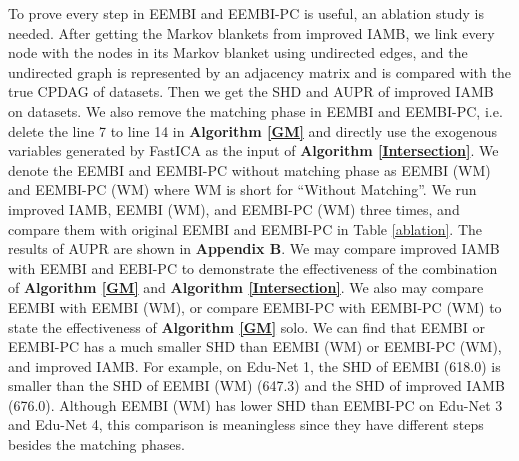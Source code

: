 \documentclass[twoside,11pt]{article}
\begin{document}
To prove every step in EEMBI and EEMBI-PC is useful, an ablation study is needed. After getting the Markov blankets from improved IAMB, we link every node with the nodes in its Markov blanket using undirected edges, and the undirected graph is represented by an adjacency matrix and is compared with the true CPDAG of datasets. Then we get the SHD and AUPR of improved IAMB on datasets. We also remove the matching phase in EEMBI and EEMBI-PC, i.e. delete the line 7 to line 14 in \textbf{Algorithm \ref{GM}} and directly use the exogenous variables generated by FastICA as the input of \textbf{Algorithm \ref{Intersection}}. We denote the EEMBI and EEMBI-PC without matching phase as EEMBI (WM) and EEMBI-PC (WM) where WM is short for ``Without Matching''. We run improved IAMB, EEMBI (WM), and EEMBI-PC (WM) three times, and compare them with original EEMBI and EEMBI-PC in Table \ref{ablation}. The results of AUPR are shown in \textbf{Appendix B}. We may compare improved IAMB with EEMBI and EEBI-PC to demonstrate the effectiveness of the combination of \textbf{Algorithm \ref{GM}} and \textbf{Algorithm \ref{Intersection}}. We also may compare EEMBI with EEMBI (WM), or compare EEMBI-PC with EEMBI-PC (WM) to state the effectiveness of \textbf{Algorithm \ref{GM}} solo. We can find that EEMBI or EEMBI-PC has a much smaller SHD than EEMBI (WM) or EEMBI-PC (WM), and improved IAMB. For example, on Edu-Net 1, the SHD of EEMBI (618.0) is smaller than the SHD of EEMBI (WM) (647.3) and the SHD of improved IAMB (676.0). Although EEMBI (WM) has lower SHD than EEMBI-PC on Edu-Net 3 and Edu-Net 4, this comparison is meaningless since they have different steps besides the matching phases. 






\begin{table*}[htpb]
\centering
\fontsize{10}{22}\selectfont
\caption{SHD on Dream3 datasets}\label{ablation}
\end{table*}
\end{document}
